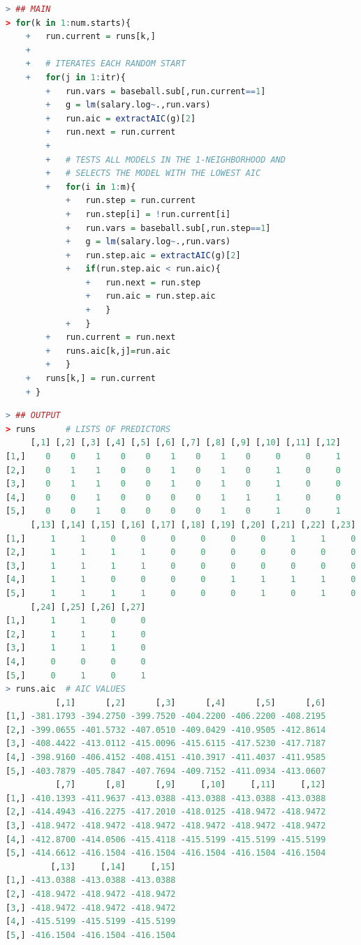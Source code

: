 \documentclass[11pt,a4paper,oneside]{book}
\begin{document}
\begin{lstlisting}[language=r]
> ## MAIN
> for(k in 1:num.starts){
	+ 	run.current = runs[k,]
	+ 
	+ 	# ITERATES EACH RANDOM START
	+ 	for(j in 1:itr){
		+ 	run.vars = baseball.sub[,run.current==1]
		+ 	g = lm(salary.log~.,run.vars)
		+ 	run.aic = extractAIC(g)[2]
		+ 	run.next = run.current
		+ 
		+ 	# TESTS ALL MODELS IN THE 1-NEIGHBORHOOD AND 
		+ 	# SELECTS THE MODEL WITH THE LOWEST AIC
		+ 	for(i in 1:m){
			+ 	run.step = run.current
			+ 	run.step[i] = !run.current[i]
			+ 	run.vars = baseball.sub[,run.step==1]
			+ 	g = lm(salary.log~.,run.vars)
			+ 	run.step.aic = extractAIC(g)[2]
			+ 	if(run.step.aic < run.aic){
				+ 	run.next = run.step
				+ 	run.aic = run.step.aic
				+ 	}
			+ 	}
		+ 	run.current = run.next
		+ 	runs.aic[k,j]=run.aic
		+ 	}
	+ 	runs[k,] = run.current
	+ }
\end{lstlisting}
\begin{lstlisting}[language=r]
> ## OUTPUT
> runs 		# LISTS OF PREDICTORS
     [,1] [,2] [,3] [,4] [,5] [,6] [,7] [,8] [,9] [,10] [,11] [,12]
[1,]    0    0    1    0    0    1    0    1    0     0     0     1
[2,]    0    1    1    0    0    1    0    1    0     1     0     0
[3,]    0    1    1    0    0    1    0    1    0     1     0     0
[4,]    0    0    1    0    0    0    0    1    1     1     0     0
[5,]    0    0    1    0    0    0    0    1    0     1     0     1
     [,13] [,14] [,15] [,16] [,17] [,18] [,19] [,20] [,21] [,22] [,23]
[1,]     1     1     0     0     0     0     0     0     1     1     0
[2,]     1     1     1     1     0     0     0     0     0     0     0
[3,]     1     1     1     1     0     0     0     0     0     0     0
[4,]     1     1     0     0     0     0     1     1     1     1     0
[5,]     1     1     1     1     0     0     0     1     0     1     0
     [,24] [,25] [,26] [,27]
[1,]     1     1     0     0
[2,]     1     1     1     0
[3,]     1     1     1     0
[4,]     0     0     0     0
[5,]     0     1     0     1
> runs.aic 	# AIC VALUES
          [,1]      [,2]      [,3]      [,4]      [,5]      [,6]
[1,] -381.1793 -394.2750 -399.7520 -404.2200 -406.2200 -408.2195
[2,] -399.0655 -401.5732 -407.0510 -409.0429 -410.9505 -412.8614
[3,] -408.4422 -413.0112 -415.0096 -415.6115 -417.5230 -417.7187
[4,] -398.9160 -406.4152 -408.4151 -410.3917 -411.4037 -411.9585
[5,] -403.7879 -405.7847 -407.7694 -409.7152 -411.0934 -413.0607
          [,7]      [,8]      [,9]     [,10]     [,11]     [,12]
[1,] -410.1393 -411.9637 -413.0388 -413.0388 -413.0388 -413.0388
[2,] -414.4943 -416.2275 -417.2010 -418.0125 -418.9472 -418.9472
[3,] -418.9472 -418.9472 -418.9472 -418.9472 -418.9472 -418.9472
[4,] -412.8700 -414.0506 -415.4118 -415.5199 -415.5199 -415.5199
[5,] -414.6612 -416.1504 -416.1504 -416.1504 -416.1504 -416.1504
         [,13]     [,14]     [,15]
[1,] -413.0388 -413.0388 -413.0388
[2,] -418.9472 -418.9472 -418.9472
[3,] -418.9472 -418.9472 -418.9472
[4,] -415.5199 -415.5199 -415.5199
[5,] -416.1504 -416.1504 -416.1504
\end{lstlisting}
\end{document}
